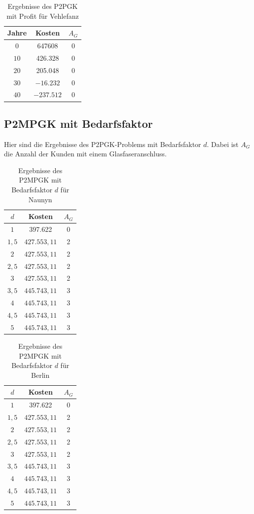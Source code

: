 \documentclass[11pt,a4paper]{article}
\theoremstyle{my_th_style1}
\begin{document}
\begin{table}[h]
	\centering
	\begin{tabular}{c|c|c}
		\centering
		Jahre & Kosten & $A_G$ \\	
		\hline
		$0$   	 & 647608  &0  \\
		$10$ 	&  426.328 & 0  \\
		$20$   	&  205.048  & 0  \\
		$30$    & $-16.232$& 0  \\
		$40$    &  $-237.512$ & 0 \\
	\end{tabular}
	\label{P2PGKProfitV}
	\caption{Ergebnisse des P2PGK mit Profit f\"ur Vehlefanz} 
\end{table}

\subsection*{P2MPGK mit Bedarfsfaktor}
Hier sind die Ergebnisse des P2PGK-Problems mit Bedarfsfaktor $d$. Dabei ist $A_G$ die Anzahl der Kunden mit einem Glasfaseranschluss.
\begin{table}[h]
	\centering
		\begin{tabular}{c|c|c}
	\centering
	$d$ & Kosten & $A_G$ \\	
	\hline
	$1$   	 &  397.622 & 0  \\
	$1,5$ 	&   $427.553,11$  & 2  \\
	$2$   	&   $427.553,11$ & 2  \\
	$2,5$   	&   $427.553,11$ & 2  \\
	$3$    &   $427.553,11$ & 2  \\
	$3,5$   	&   $445.743,11$ & 3  \\
	$4$   	&   $445.743,11$& 3  \\
	$4,5$    & $445.743,11$ & 3 \\
	$5$   	&   $445.743,11$& 3  \\
\end{tabular}
	\label{P2MPGKBedarfN}
	\caption{Ergebnisse des P2MPGK mit Bedarfsfaktor $d$ f\"ur Naunyn} 
\end{table}

\begin{table}[h]
			\centering
			\begin{tabular}{c|c|c}
				\centering
				$d$ & Kosten & $A_G$ \\	
		\hline
	$1$   	 &  397.622 & 0  \\
	$1,5$ 	&   $427.553,11$  & 2  \\
	$2$   	&   $427.553,11$ & 2  \\
	$2,5$   	&   $427.553,11$ & 2  \\
	$3$    &   $427.553,11$ & 2  \\
	$3,5$   	&   $445.743,11$ & 3  \\
	$4$   	&   $445.743,11$& 3  \\
	$4,5$    & $445.743,11$ & 3 \\
	$5$   	&   $445.743,11$& 3  \\	
			\end{tabular}
			\label{P2PGKBedarfB}
			\caption{Ergebnisse des P2MPGK mit Bedarfsfaktor $d$ f\"ur Berlin} 
\end{table}
\end{document}

